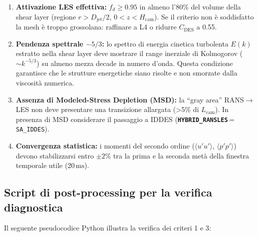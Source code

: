 \documentclass[11pt,a4paper]{article}
\newcommand{\kw}[1]{\texttt{\color{keywordcolor}\bfseries #1}}
\providecommand{\ms}{}\renewcommand{\ms}{\ensuremath{\,\mathrm{ms}}}
\begin{document}
\begin{enumerate}
  \item \textbf{Attivazione LES effettiva:} $f_d \geq 0.95$ in almeno l'80\%
        del volume della shear layer (regione $r > D_\mathrm{jet}/2$,
        $0 < z < H_\mathrm{cam}$). Se il criterio non è soddisfatto la mesh
        è troppo grossolana: raffinare a L4 o ridurre $C_\mathrm{DES}$
        a 0.55.
  \item \textbf{Pendenza spettrale $-5/3$:} lo spettro di energia cinetica
        turbolenta $E(k)$ estratto nella shear layer deve mostrare il range
        inerziale di Kolmogorov ($\sim k^{-5/3}$) su almeno mezza decade in
        numero d'onda. Questa condizione garantisce che le strutture energetiche
        siano risolte e non smorzate dalla viscosità numerica.
  \item \textbf{Assenza di Modeled-Stress Depletion (MSD):} la ``gray area''
        RANS$\to$LES non deve presentare una transizione allargata (>5\% di
        $L_\mathrm{cam}$). In presenza di MSD considerare il passaggio a
        IDDES (\kw{HYBRID\_RANSLES}\,=\,\texttt{SA\_IDDES}).
  \item \textbf{Convergenza statistica:} i momenti del secondo ordine
        ($\langle u'u' \rangle$, $\langle p'p' \rangle$) devono stabilizzarsi
        entro $\pm 2\%$ tra la prima e la seconda metà della finestra temporale
        utile (20\ms).
\end{enumerate}

\subsection{Script di post-processing per la verifica diagnostica}

Il seguente pseudocodice Python illustra la verifica dei criteri 1 e 3:
\end{document}
